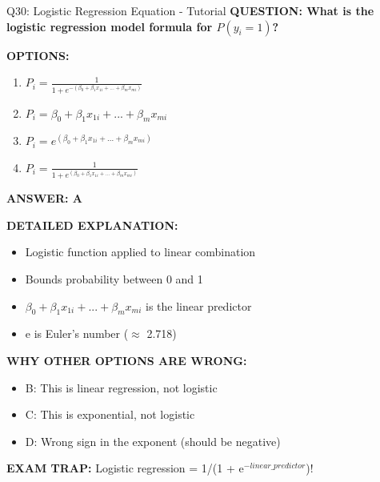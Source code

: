 \documentclass[8pt]{beamer}
\begin{document}
	\begin{frame}{Q30: Logistic Regression Equation - Tutorial}
		\fontsize{6.5}{7.5}\selectfont
		\textbf{QUESTION: What is the logistic regression model formula for $P(y_i = 1)$?}
		
		\vspace{0.1cm}
		\textbf{OPTIONS:}
		\begin{enumerate}
			\item $P_i = \frac{1}{1 + e^{-(\beta_0 + \beta_1 x_{1i} + ... + \beta_m x_{mi})}}$
			\item $P_i = \beta_0 + \beta_1 x_{1i} + ... + \beta_m x_{mi}$
			\item $P_i = e^{(\beta_0 + \beta_1 x_{1i} + ... + \beta_m x_{mi})}$
			\item $P_i = \frac{1}{1 + e^{(\beta_0 + \beta_1 x_{1i} + ... + \beta_m x_{mi})}}$
		\end{enumerate}
		
		\vspace{0.1cm}
		\textcolor{myblue}{\textbf{ANSWER: A}}
		
		\vspace{0.1cm}
		\textbf{DETAILED EXPLANATION:}
		\begin{itemize}
			\item Logistic function applied to linear combination
			\item Bounds probability between 0 and 1
			\item $\beta_0 + \beta_1 x_{1i} + ... + \beta_m x_{mi}$ is the linear predictor
			\item e is Euler's number ($\approx$ 2.718)
		\end{itemize}
		
		\vspace{0.1cm}
		\textcolor{myred}{\textbf{WHY OTHER OPTIONS ARE WRONG:}}
		\begin{itemize}
			\item \textcolor{myred}{B:} This is linear regression, not logistic
			\item \textcolor{myred}{C:} This is exponential, not logistic
			\item \textcolor{myred}{D:} Wrong sign in the exponent (should be negative)
		\end{itemize}
		
		\textcolor{myred}{\textbf{EXAM TRAP:}} Logistic regression = \textcolor{myblue}{1/(1 + e$^{-linear\_predictor}$)}!
	\end{frame}
	
\end{document}
